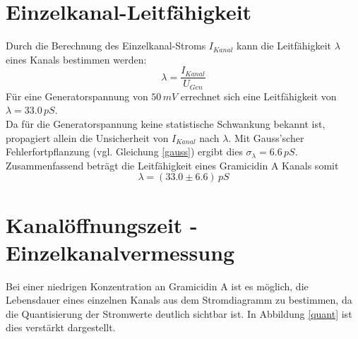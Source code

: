 \documentclass{include/thesisclass3}
\newcommand{\e}[1]{\,\si{#1}}
\begin{document}
\section{Einzelkanal-Leitfähigkeit}
Durch die Berechnung des Einzelkanal-Stroms $I_{Kanal}$ kann die Leitfähigkeit $\lambda$ eines Kanals bestimmen werden:
\[ \lambda = \frac{I_{Kanal}}{U_{Gen}}\]
Für eine Generatorspannung von $50\e{mV}$ errechnet sich eine Leitfähigkeit von $\lambda = 33.0\e{pS}$.\\
Da für die Generatorspannung keine statistische Schwankung bekannt ist, propagiert allein die Unsicherheit von $I_{Kanal}$ nach $\lambda$. Mit Gauss'scher Fehlerfortpflanzung (vgl. Gleichung \ref{gauss}) ergibt dies $\sigma_\lambda = 6.6\e{pS}$. Zusammenfassend beträgt die Leitfähigkeit eines Gramicidin A Kanals somit
\[\lambda = (33.0 \pm 6.6)\e{pS}\]



\section{Kanalöffnungszeit - Einzelkanalvermessung}
Bei einer niedrigen Konzentration an Gramicidin A ist es möglich, die Lebensdauer eines einzelnen Kanals aus dem Stromdiagramm zu bestimmen, da die Quantisierung der Stromwerte deutlich sichtbar ist. In Abbildung \ref{quant} ist dies verstärkt dargestellt.
\end{document}
